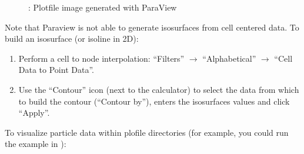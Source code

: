 \documentclass[letterpaper,10pt,english]{sphinxmanual}
\begin{document}
\begin{center}

\begin{figure}[htbp]
\centering
\capstart

\noindent{}
\caption{: Plotfile image generated with ParaView}\label{\detokenize{Visualization:id5}}\label{\detokenize{Visualization:fig-paraview}}\end{figure}

\end{center}

\sphinxAtStartPar
Note that Paraview is not able to generate iso\sphinxhyphen{}surfaces from cell centered data. To build an iso\sphinxhyphen{}surface (or iso\sphinxhyphen{}line in 2D):
\begin{enumerate}
%
\item {} 
\sphinxAtStartPar
Perform a cell to node interpolation: “Filters” \(\rightarrow\) “Alphabetical” \(\rightarrow\) “Cell Data to Point Data”.

\item {} 
\sphinxAtStartPar
Use the “Contour” icon (next to the calculator) to select the data from which to build the contour (“Contour by”), enters the iso\sphinxhyphen{}surfaces
values and click “Apply”.

\end{enumerate}

\sphinxAtStartPar
To visualize particle data within plofile directories (for example, you could
run the  example in ):
\end{document}
